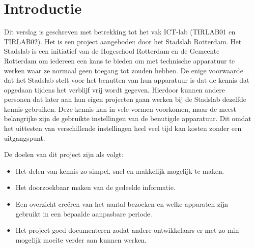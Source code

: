 \chapter{Introductie}

Dit verslag is geschreven met betrekking tot het vak ICT-lab (TIRLAB01 en TIRLAB02). Het is een project aangeboden door het Stadslab Rotterdam. Het Stadslab is een initiatief van de Hogeschool Rotterdam en de Gemeente Rotterdam om iedereen een kans te bieden om met technische apparatuur te werken waar ze normaal geen toegang tot zouden hebben. De enige voorwaarde dat het Stadslab stelt voor het benutten van hun apparatuur is dat de kennis dat opgedaan tijdens het verblijf vrij wordt gegeven. Hierdoor kunnen  andere personen dat later aan hun eigen projecten gaan werken bij de Stadslab dezelfde kennis gebruiken. Deze kennis kan in vele vormen voorkomen, maar de meest belangrijke zijn de gebruikte instellingen van de benutigde apparatuur. Dit omdat het uittesten van verschillende instellingen heel veel tijd kan kosten zonder een uitgangspunt.


De doelen van dit project zijn als volgt:
\begin {itemize}
\item Het delen van kennis zo simpel, snel en makkelijk mogelijk te maken.
\item Het doorzoekbaar maken van de gedeelde informatie.	
\item Een overzicht cre\"eren van het aantal bezoeken en welke apparaten zijn gebruikt in een bepaalde aanpasbare periode.
\item Het project goed documenteren zodat andere ontwikkelaars er met zo min mogelijk moeite verder aan kunnen werken.
\end {itemize}